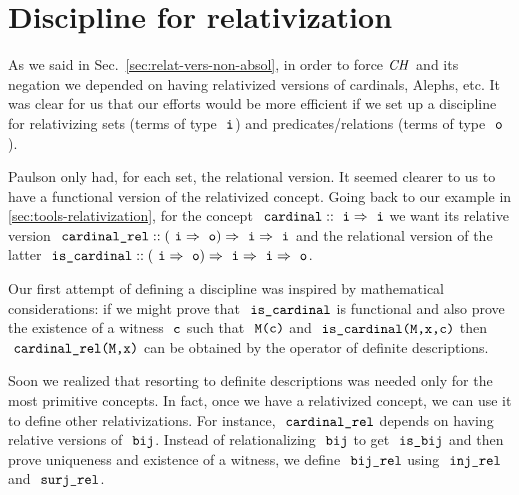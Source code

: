 \appendix

\section{Discipline for relativization}

As we said in Sec.~\ref{sec:relat-vers-non-absol}, in order to force
$\mathit{CH}$ and its negation we depended on having relativized versions of
cardinals, Alephs, etc. It was clear for us that our efforts would be
more efficient if we set up a discipline for relativizing sets (terms
of type $\tyi$) and predicates/relations (terms of type $\tyo$).

Paulson only had, for each set, the relational version. It seemed
clearer to us to have a functional version of the relativized concept.
Going back to our example in \ref{sec:tools-relativization}, for the
concept $\isatt{cardinal}::\tyi \fun \tyi$ we want its relative
version
$\isatt{cardinal{\uscore}rel}::(\tyi \fun \tyo) \fun \tyi \fun\tyi$
and the relational version of the latter
$\isatt{is{\uscore}cardinal}::(\tyi \fun \tyo) \fun \tyi \fun \tyi
\fun \tyo$.

Our first attempt of defining a discipline was inspired by
mathematical considerations: if we might prove that
$\isatt{is{\uscore}cardinal}$ is functional and also prove the
existence of a witness $\isatt{c}$ such that $\isatt{M(c)}$ and
$\isatt{is{\uscore}cardinal(M,x,c)}$ then
$\isatt{cardinal{\uscore}rel(M,x)}$ can be obtained by the operator of
definite descriptions.

Soon we realized that resorting to definite descriptions was needed
only for the most primitive concepts. In fact, once we have a
relativized concept, we can use it to define other relativizations.
For instance, $\isatt{cardinal{\uscore}rel}$ depends on having
relative versions of $\isatt{bij}$. Instead of relationalizing
$\isatt{bij}$ to get $\isatt{is{\uscore}bij}$ and then prove
uniqueness and existence of a witness, we define
$\isatt{bij{\uscore}rel}$ using $\isatt{inj{\uscore}rel}$ and
$\isatt{surj{\uscore}rel}$.

